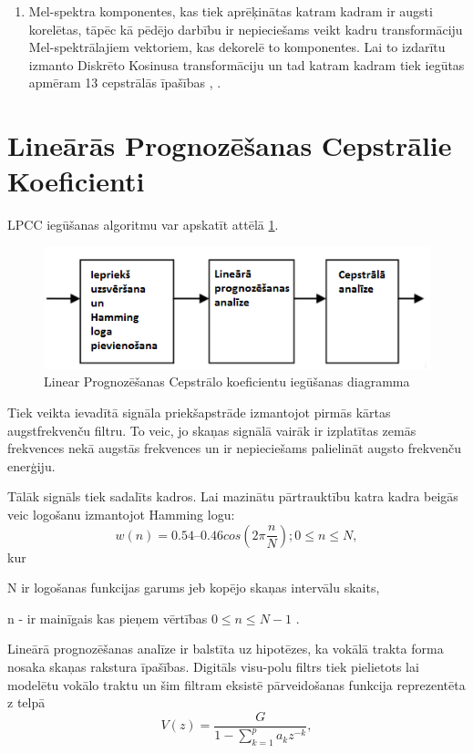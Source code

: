 \documentclass[12pt,paper=A4]{report}
\begin{document}
\begin{enumerate}
\item Mel-spektra komponentes, kas tiek aprēķinātas katram kadram ir augsti korelētas, tāpēc kā pēdējo darbību ir nepieciešams veikt kadru transformāciju Mel-spektrālajiem vektoriem, kas dekorelē to komponentes. Lai to izdarītu izmanto Diskrēto Kosinusa transformāciju \cite{dtw25} un tad katram kadram tiek iegūtas apmēram 13 cepstrālās īpašības \cite{MFCC}, \cite{http://citeseerx.ist.psu.edu/viewdoc/download?doi=10.1.1.800.1305&rep=rep1&type=pdf}. 


\end{enumerate}
\section{Lineārās Prognozēšanas Cepstrālie Koeficienti }

LPCC iegūšanas algoritmu var apskatīt attēlā \ref{lpcc}. 
 \begin{figure}[H] \centering
\includegraphics[width=1.00\textwidth]{lpcc} 
\caption{ Linear Prognozēšanas Cepstrālo koeficientu iegūšanas diagramma  \cite{http://citeseerx.ist.psu.edu/viewdoc/download?doi=10.1.1.800.1305&rep=rep1&type=pdf}}  \label{lpcc} 
\end{figure}

Tiek veikta ievadītā signāla priekšapstrāde izmantojot pirmās kārtas augstfrekvenču filtru. To veic, jo skaņas signālā vairāk ir izplatītas zemās frekvences nekā augstās frekvences un ir nepieciešams palielināt augsto frekvenču enerģiju. 

 Tālāk signāls tiek sadalīts kadros. Lai mazinātu pārtrauktību katra kadra beigās veic logošanu izmantojot Hamming logu:
\begin{equation}
w(n) = 0.54 – 0.46cos(2\pi \frac{n}{N}); 0 \leq n \leq N,
\end{equation}
kur 

N ir logošanas funkcijas garums jeb kopējo skaņas intervālu skaits,

n - ir mainīgais kas pieņem vērtības $0\leq n \leq N-1$ \cite{dtw48}. 

Lineārā prognozēšanas analīze ir balstīta uz hipotēzes, ka vokālā trakta forma nosaka skaņas rakstura īpašības. Digitāls visu-polu filtrs \cite{allpole} tiek pielietots lai modelētu vokālo traktu un šim filtram eksistē pārveidošanas funkcija reprezentēta z telpā 
\begin{equation}
V(z)=\frac{G}{1-\sum\limits_{k=1}^pa_kz^{-k}},
\end{equation}
\end{document}
